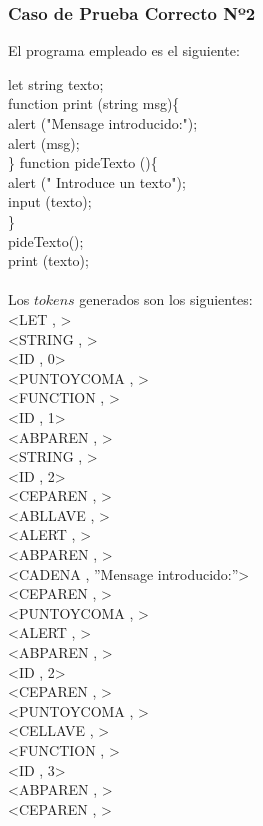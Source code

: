 \documentclass{article}
\begin{document}
\subsubsection{Caso de Prueba Correcto Nº2}
\begin{center} 
El programa empleado es el siguiente:
\end{center}
\begin{flushleft}
let string texto;\\
function print (string msg)\{\\
\qquad	alert ("Mensage introducido:");\\
\qquad	alert (msg);\\
\}
function pideTexto ()\{\\
\qquad	alert (" Introduce un texto");\\
\qquad	input (texto);\\
\}\\
pideTexto();\\
print (texto);\\
\quad\\
Los $tokens$ generados son los siguientes:\\
<LET , >\\
<STRING , >\\
<ID , 0>\\
<PUNTOYCOMA , >\\
<FUNCTION , >\\
<ID , 1>\\
<ABPAREN , >\\
<STRING , >\\
<ID , 2>\\
<CEPAREN , >\\
<ABLLAVE , >\\
<ALERT , >\\
<ABPAREN , >\\
<CADENA , ''Mensage introducido:''>\\
<CEPAREN , >\\
<PUNTOYCOMA , >\\
<ALERT , >\\
<ABPAREN , >\\
<ID , 2>\\
<CEPAREN , >\\
<PUNTOYCOMA , >\\
<CELLAVE , >\\
<FUNCTION , >\\
<ID , 3>\\
<ABPAREN , >\\
<CEPAREN , >\\

\end{flushleft}
\end{document}

